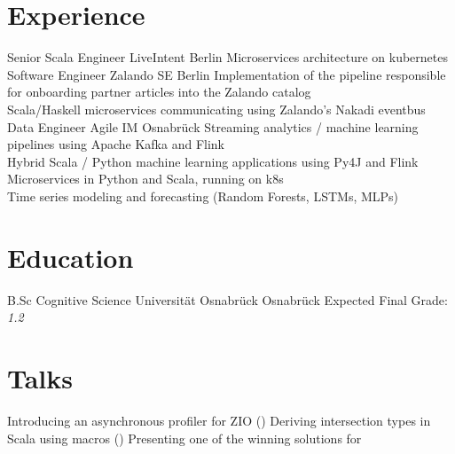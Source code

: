 \documentclass[10pt,a4paper,sans]{moderncv}
\begin{document}
\makecvtitle

\section{Experience}
        {Senior Scala Engineer}
        {LiveIntent}
        {Berlin}
        {}
        {Microservices architecture on kubernetes}
        {Software Engineer}
        {Zalando SE}
        {Berlin}
        {}
        {Implementation of the pipeline responsible for onboarding partner articles into the Zalando catalog \\
         Scala/Haskell microservices communicating using Zalando's Nakadi eventbus}
        {Data Engineer}
        {Agile IM}
        {Osnabrück}
        {}
        {Streaming analytics / machine learning pipelines using Apache Kafka and Flink \\
         Hybrid Scala / Python machine learning applications using Py4J and Flink \\
         Microservices in Python and Scala, running on k8s \\
         Time series modeling and forecasting (Random Forests, LSTMs, MLPs)}

\section{Education}
        {B.Sc Cognitive Science}
        {Universität Osnabrück}
        {Osnabrück}
        {}
        {Expected Final Grade: \emph{1.2}}

\section{Talks}
       {Introducing an asynchronous profiler for ZIO ()}
       {Deriving intersection types in Scala using macros ()}
       {Presenting one of the winning solutions for }
\end{document}
